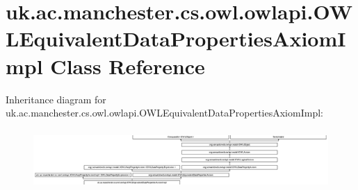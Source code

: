 \hypertarget{classuk_1_1ac_1_1manchester_1_1cs_1_1owl_1_1owlapi_1_1_o_w_l_equivalent_data_properties_axiom_impl}{\section{uk.\-ac.\-manchester.\-cs.\-owl.\-owlapi.\-O\-W\-L\-Equivalent\-Data\-Properties\-Axiom\-Impl Class Reference}
\label{classuk_1_1ac_1_1manchester_1_1cs_1_1owl_1_1owlapi_1_1_o_w_l_equivalent_data_properties_axiom_impl}
}
Inheritance diagram for uk.\-ac.\-manchester.\-cs.\-owl.\-owlapi.\-O\-W\-L\-Equivalent\-Data\-Properties\-Axiom\-Impl\-:\begin{figure}[H]
\begin{center}
\leavevmode
\includegraphics[height=2.308599cm]{classuk_1_1ac_1_1manchester_1_1cs_1_1owl_1_1owlapi_1_1_o_w_l_equivalent_data_properties_axiom_impl}
\end{center}
\end{figure}
